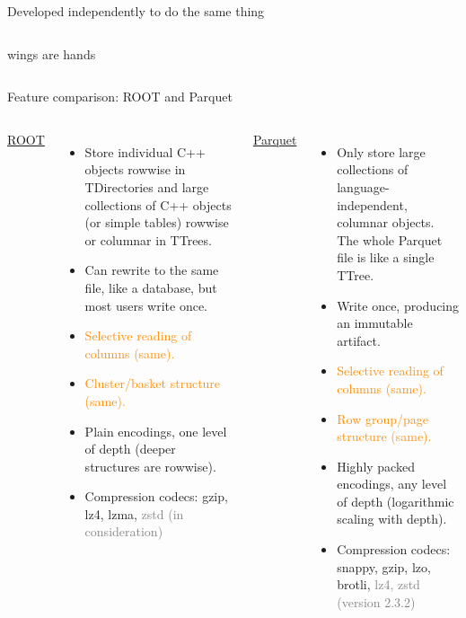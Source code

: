 \documentclass[aspectratio=169]{beamer}
\begin{document}
\begin{frame}{Developed independently to do the same thing}
\begin{columns}
\begin{center}
\vspace{0.25 cm}
wings are hands
\end{center}
\end{columns}
\end{frame}

\begin{frame}{Feature comparison: ROOT and Parquet}
\vspace{0.5 cm}
\begin{columns}[t]
{\large \underline{ROOT}}

\begin{itemize}
\item Store individual C++ objects rowwise in TDirectories and large collections of C++ objects (or simple tables) rowwise or columnar in TTrees.
\item Can rewrite to the same file, like a database, but most users write once.
\item \textcolor{darkorange}{Selective reading of columns (same).}
\item \textcolor{darkorange}{Cluster/basket structure (same).}
\item Plain encodings, one level of depth (deeper structures are rowwise).
\item Compression codecs: gzip, lz4, lzma, \textcolor{gray}{zstd (in consideration)}
\end{itemize}

{\large \underline{Parquet}}

\begin{itemize}
\item Only store large collections of language-independent, columnar objects. The whole Parquet file is like a single TTree.
\item Write once, producing an immutable artifact.
\item \textcolor{darkorange}{Selective reading of columns (same).}
\item \textcolor{darkorange}{Row group/page structure (same).}
\item Highly packed encodings, any level of depth (logarithmic scaling with depth).
\item Compression codecs: snappy, gzip, lzo, brotli, \textcolor{gray}{lz4, zstd (version 2.3.2)}
\end{itemize}
\end{columns}
\end{frame}
\end{document}
